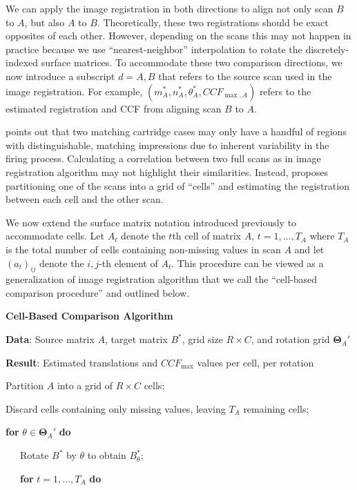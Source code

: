 \documentclass[11pt,]{isuthesis}
\begin{document}
We can apply the image registration in both directions to align not only scan \(B\) to \(A\), but also \(A\) to \(B\).
Theoretically, these two registrations should be exact opposites of each other.
However, depending on the scans this may not happen in practice because we use ``nearest-neighbor'' interpolation to rotate the discretely-indexed surface matrices.
To accommodate these two comparison directions, we now introduce a subscript \(d = A,B\) that refers to the source scan used in the image registration.
For example, \((m_A^*, n_A^*, \theta_A^*, CCF_{\max,A})\) refers to the estimated registration and CCF from aligning scan \(B\) to \(A\).

\citet{song_proposed_2013} points out that two matching cartridge cases may only have a handful of regions with distinguishable, matching impressions due to inherent variability in the firing process.
Calculating a correlation between two full scans as in image registration algorithm may not highlight their similarities.
Instead, \citet{song_proposed_2013} proposes partitioning one of the scans into a grid of ``cells'' and estimating the registration between each cell and the other scan.

We now extend the surface matrix notation introduced previously to accommodate cells.
Let \(A_{t}\) denote the \(t\)th cell of matrix \(A\), \(t = 1,...,T_A\) where \(T_A\) is the total number of cells containing non-missing values in scan \(A\) and let \((a_t)_{ij}\) denote the \(i,j\)-th element of \(A_t\).
This procedure can be viewed as a generalization of image registration algorithm that we call the ``cell-based comparison procedure'' and outlined below.

\textbf{Cell-Based Comparison Algorithm}

\textbf{Data}: Source matrix \(A\), target matrix \(B^*\), grid size \(R \times C\), and rotation grid \(\pmb{\Theta}_{A}'\)

\textbf{Result}: Estimated translations and \(CCF_{\max}\) values per cell, per rotation

Partition \(A\) into a grid of \(R \times C\) cells;

Discard cells containing only missing values, leaving \(T_A\) remaining cells;

\textbf{for} \(\theta \in \pmb{\Theta}_{A}'\) \textbf{do}

~~~Rotate \(B^*\) by \(\theta\) to obtain \(B_{\theta}^*\);

~~~\textbf{for} \(t = 1,...,T_A\) \textbf{do}
\end{document}
